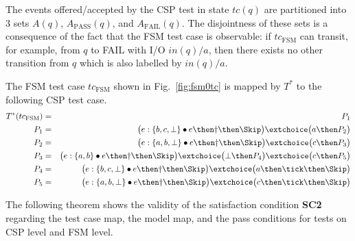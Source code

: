 The events offered/accepted by the CSP test in state $tc(q)$ are partitioned into
3 sets $A(q)$, $A_\text{PASS}(q)$, and $A_\text{FAIL}(q)$. The disjointness of these
sets is a consequence of the fact that the FSM test case is observable: if 
$tc_\text{FSM}$ can transit, for example, from $q$ to FAIL with I/O $in(q)/a$, 
then there exists no other transition from $q$ which is also 
labelled by $in(q)/a$.



\begin{example}
The FSM test case $tc_\text{FSM}$
shown in Fig.~\ref{fig:fsm0tc} is mapped by $T^*$ to the following
CSP test case.
\begin{eqnarray*}
T^*(tc_\text{FSM}) & = & P_1
\\
P_1 & = & \big(e:\{ b,c,\bot \} \bullet e \then \dag\then\Skip\big)
\extchoice
 \big( a \then P_2 \big) 
\\
P_2 & = & \big( e : \{ a,b,\bot \}\bullet e\then \dag\then\Skip  \big)
\extchoice
\big( c\then P_3 \big)
\\
P_3 & = & \big( e : \{ a,b \}\bullet e\then \dag\then\Skip  \big)
\extchoice
\big( \bot \then P_4 \big)
\extchoice
\big( c\then P_5 \big)
\\
P_4 & = & \big( e : \{ b,c,\bot \}\bullet e\then \dag\then\Skip  \big)
\extchoice
\big( a\then\tick\then \Skip \big)
\\
P_5 & = & \big( e : \{ a,b,\bot \}\bullet e\then \dag\then\Skip  \big)
\extchoice
\big( c\then\tick\then \Skip \big)
\end{eqnarray*}
\xbox
\end{example}

The following theorem shows the validity of the satisfaction condition {\bf SC2}
regarding the test case map, the model map, and the pass conditions for tests on CSP level and FSM level.

